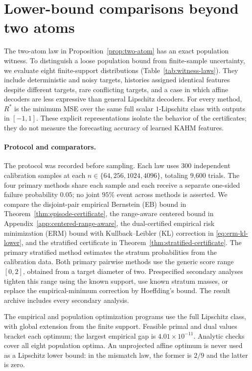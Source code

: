 \section{Lower-bound comparisons beyond two atoms}
\label{sec:witness-comparison}

The two-atom law in Proposition~\ref{prop:two-atom} has an exact population
witness. To distinguish a loose population bound from finite-sample uncertainty,
we evaluate eight finite-support distributions (Table~\ref{tab:witness-laws}).
They include deterministic and noisy targets, histories assigned identical
features despite different targets, rare conflicting targets, and a case in
which affine decoders are less expressive than general Lipschitz decoders.
For every method, $R^*$ is the minimum MSE over the same full scalar
$1$-Lipschitz class with outputs in $[-1,1]$. These explicit representations
isolate the behavior of the certificates;
they do not measure the forecasting accuracy of learned KAHM features.



\paragraph{Protocol and comparators.}
The protocol was recorded before sampling. Each law uses 300 independent
calibration samples at each $n\in\{64,256,1024,4096\}$, totaling 9,600 trials.
The four primary methods share each sample and each receive a separate
one-sided failure probability $0.05$; no joint $95\%$ event across methods
is asserted. We compare the disjoint-pair empirical Bernstein (EB) bound in
Theorem~\ref{thm:episode-certificate}, the range-aware centered bound in
Appendix~\ref{app:centered-range-aware}, the dual-certified empirical risk
minimization (ERM) bound with Kullback--Leibler (KL) correction in
\eqref{eq:erm-kl-lower}, and the
stratified certificate in Theorem~\ref{thm:stratified-certificate}.
The primary stratified method estimates the stratum probabilities from the
calibration data. Both primary pairwise methods use the generic score range
$[0,2]$, obtained from a target diameter of two.
Prespecified secondary analyses tighten this range using the known support,
use known stratum masses, or replace the empirical-minimum correction by
Hoeffding's bound. The result archive includes every secondary analysis.

The empirical and population optimization programs use the full Lipschitz
class, with global extension from the finite support. Feasible primal and dual
values bracket each optimum; the largest empirical gap is
$4.01\times10^{-11}$. Analytic checks cover all eight population optima.
An unprojected affine optimum is never used as a Lipschitz lower bound: in the
mismatch law, the former is $2/9$ and the latter is zero.


